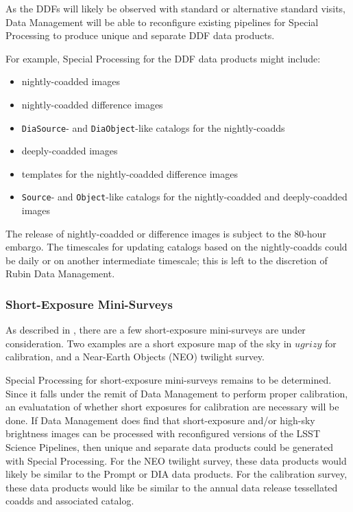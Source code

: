 As the DDFs will likely be observed with standard or alternative standard 
visits, Data Management will be able to reconfigure existing pipelines for
Special Processing to produce unique and separate DDF data products.

For example, Special Processing for the DDF data products might include:
\begin{itemize}
\item nightly-coadded images
\item nightly-coadded difference images
\item {\tt DiaSource}- and {\tt DiaObject}-like catalogs for the nightly-coadds
\item deeply-coadded images
\item templates for the nightly-coadded difference images
\item {\tt Source}- and {\tt Object}-like catalogs for the nightly-coadded and deeply-coadded images
\end{itemize}

The release of nightly-coadded or difference images is subject to the 80-hour embargo.
The timescales for updating catalogs based on the nightly-coadds could be daily
or on another intermediate timescale; this is left to the discretion of Rubin Data Management.


\subsubsection{Short-Exposure Mini-Surveys}

As described in , there are a few
short-exposure mini-surveys are under consideration.
Two examples are a short exposure map of the sky in $ugrizy$ for calibration,
and a Near-Earth Objects (NEO) twilight survey.

Special Processing for short-exposure mini-surveys remains to
be determined.
Since it falls under the remit of Data Management to perform proper calibration,
an evaluatation of whether short exposures for calibration are necessary
will be done. 
If Data Management does find that short-exposure and/or high-sky brightness images
can be processed with reconfigured versions of the LSST Science Pipelines,
then unique and separate data products could be generated with Special Processing.
For the NEO twilight survey, these data products would likely be similar to the
Prompt or DIA data products.
For the calibration survey, these data products would like be similar to the
annual data release tessellated coadds and associated catalog.

